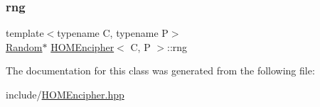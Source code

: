 \mbox{\label{classHOMEncipher_a93a3cf6c4d8c7105380a2b13a08db774}} 
\subsubsection{\texorpdfstring{rng}{rng}}
{\footnotesize\ttfamily template$<$typename C, typename P$>$ \\
\hyperlink{classRandom}{Random}$\ast$ \hyperlink{classHOMEncipher}{H\+O\+M\+Encipher}$<$ C, P $>$\+::rng\hspace{0.3cm}{\ttfamily [protected]}}



The documentation for this class was generated from the following file\+:\begin{DoxyCompactItemize}
\item 
include/\hyperlink{HOMEncipher_8hpp}{H\+O\+M\+Encipher.\+hpp}\end{DoxyCompactItemize}
